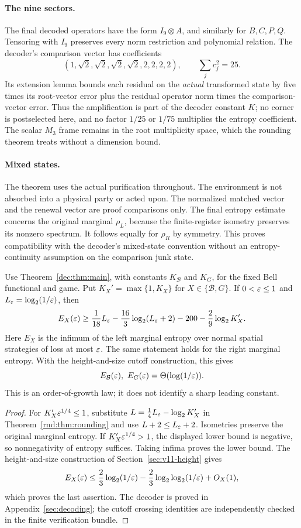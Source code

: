 \paragraph{The nine sectors.}
The final decoded operators have the form $I_9\otimes A$, and similarly for $B,C,P,Q$. Tensoring with $I_9$ preserves every norm restriction and polynomial relation. The decoder's comparison vector has coefficients
\[
 (1,\sqrt2,\sqrt2,\sqrt2,\sqrt2,2,2,2,2),
 \qquad\sum_jc_j^2=25.
\]
Its extension lemma bounds each residual on the \emph{actual} transformed state by five times its root-vector error plus the residual operator norm times the comparison-vector error. Thus the amplification is part of the decoder constant $K$; no corner is postselected here, and no factor $1/25$ or $1/75$ multiplies the entropy coefficient. The scalar $M_3$ frame remains in the root multiplicity space, which the rounding theorem treats without a dimension bound.

\paragraph{Mixed states.}
The theorem uses the actual purification throughout. The environment is not absorbed into a physical party or acted upon. The normalized matched vector and the renewal vector are proof comparisons only. The final entropy estimate concerns the original marginal $\rho_L$, because the finite-register isometry preserves its nonzero spectrum. It follows equally for $\rho_R$ by symmetry. This proves compatibility with the decoder's mixed-state convention without an entropy-continuity assumption on the comparison junk state.

\begin{corollary}\label{rnd:cor:game}
Use Theorem~\ref{dec:thm:main}, with constants $K_{\mathcal B}$ and $K_G$, for the fixed Bell functional and game. Put $K_X'=\max\{1,K_X\}$ for $X\in\{\mathcal B,G\}$. If $0<\varepsilon\le1$ and $L_\varepsilon=\log_2(1/\varepsilon)$, then
\[
 E_X(\varepsilon)\ge\frac1{18}L_\varepsilon
 -\frac{16}{3}\log_2(L_\varepsilon+2)
 -200-\frac29\log_2 K_X'.
\]
Here $E_X$ is the infimum of the left marginal entropy over normal spatial strategies of loss at most $\varepsilon$. The same statement holds for the right marginal entropy. With the height-and-size cutoff construction, this gives
\[
 E_{\mathcal B}(\eps),\ E_G(\eps)=\Theta(\log(1/\eps)).
\]
This is an order-of-growth law; it does not identify a sharp leading constant.
\end{corollary}
\begin{proof}
For $K_X'\varepsilon^{1/4}\le1$, substitute
$L=\tfrac14L_\varepsilon-\log_2 K_X'$ in Theorem~\ref{rnd:thm:rounding} and use $L+2\le L_\varepsilon+2$. Isometries preserve the original marginal entropy. If $K_X'\varepsilon^{1/4}>1$, the displayed lower bound is negative, so nonnegativity of entropy suffices. Taking infima proves the lower bound. The height-and-size construction of Section~\ref{sec:v11-height} gives
\[
 E_X(\varepsilon)\le\frac23\log_2(1/\varepsilon)
 -\frac23\log_2\log_2(1/\varepsilon)+O_X(1),
\]
which proves the last assertion. The decoder is proved in Appendix~\ref{sec:decoding}; the cutoff crossing identities are independently checked in the finite verification bundle.
\end{proof}

